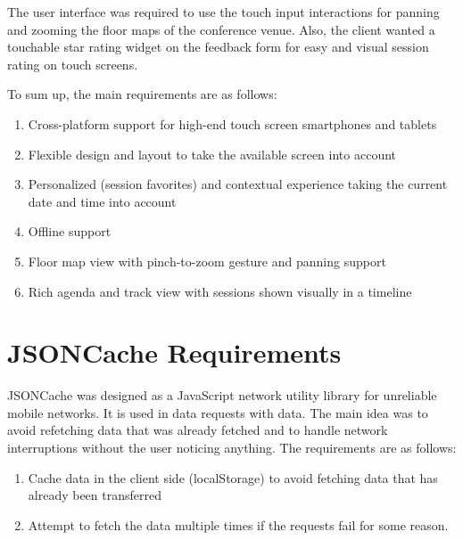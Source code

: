The user interface was required to use the touch input interactions
for panning and zooming the floor maps of the conference venue. Also,
the client wanted a touchable star rating widget on the feedback form
for easy and visual session rating on touch screens.

To sum up, the main requirements are as follows:

\begin{enumerate}
\item Cross-platform support for high-end touch screen smartphones and
  tablets
\item Flexible design and layout to take the available screen into
  account
\item Personalized (session favorites) and contextual experience
  taking the current date and time into account
\item Offline support
\item Floor map view with pinch-to-zoom gesture and panning support
\item Rich agenda and track view with sessions shown visually in a
  timeline
\end{enumerate}

\section{JSONCache Requirements}

JSONCache was designed as a JavaScript network utility library for
unreliable mobile networks. It is used in  data requests
with  data. The main idea was to avoid refetching data that
was already fetched and to handle network interruptions without the
user noticing anything. The requirements are as follows:
\begin{enumerate}
\item Cache data in the client side (localStorage) to avoid fetching
  data that has already been transferred
\item Attempt to fetch the data multiple times if the requests fail
  for some reason.
\end{enumerate}
